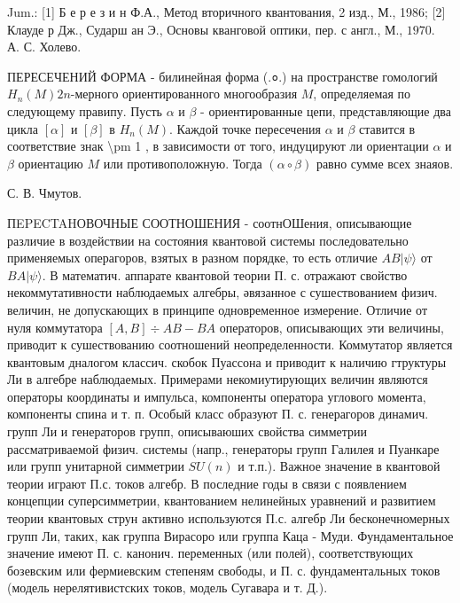 \documentclass[10pt]{article}
\begin{document}
Jum.: [1] Б е р е з и н Ф.А., Метод вторичного квантования, 2 изд., М., 1986; [2] Клауде р Дж., Сударш ан Э., Основы кванговой оптики, пер. с англ., М., $1970 . \quad$ А. С. Холево.



ПЕРЕСЕЧЕНИЙ ФОРМА - билинейная форма (.०.) на пространстве гомологий $H_{n}(M) 2 n$-мерного ориентированного многообразия $M$, определяемая по следующему правипу. Пусть $\alpha$ и $\beta$ - ориентированные цепи, представляющие два цикла $[\alpha]$ и $[\beta]$ в $H_{n}(M)$. Каждой точке пересечения $\alpha$ и $\beta$ ставится в соответствие знак \textbackslash pm 1 , в зависимости от того, индуцируют ли ориентации $\alpha$ и $\beta$ ориентацию $M$ или противоположную. Тогда $(\alpha \circ \beta)$ равно сумме всех знаяов.



С. В. Чмутов.



ПEPECTAHОВОЧНЫЕ СООТНОШЕНИЯ - соотнОШения, описывающие различие в воздействии на состояния квантовой системы последовательно применяемых операгоров, взятых в разном порядке, то есть отличие $A B|\psi\rangle$ от $B A|\psi\rangle$. В математич. аппарате квантовой теории П. с. отражают свойство некоммутативности наблюдаемых алгебры, әвязанное с сушествованием физич. величин, не допускающих в принципе одновременное измерение. Отличие от нуля коммутатора $[A, B] \div A B-B A$ операторов, описывающих эти величины, приводит к сушествованию соотношений неопределенности. Коммутатор является квантовым дналогом классич. скобок Пуассона и приводит к наличию гтруктуры Ли в алгебре наблюдаемых. Примерами некомиутирующих величин являются операторы координаты и импульса, компоненты оператора углового момента, компоненты спина и т. п. Особый класс образуют П. с. генерагоров динамич. групп Ли и генераторов групп, описываюших свойства симметрии рассматриваемой физич. системы (напр., генераторы групп Галилея и Пуанкаре или групп унитарной симметрии $S U(n)$ и т.п.). Важное значение в квантовой теории играют П.с. токов алгебр. В последние годы в связи с появлением концепции суперсимметрии, квантованием нелинейных уравнений и развитием теории квантовых струн активно используются П.с. алгебр Ли бесконечномерных групп Ли, таких, как группа Вирасоро или группа Каца - Муди. Фундаментальное значение имеют П. с. канонич. переменных (или полей), соответствующих бозевским или фермиевским степеням свободы, и П. с. фундаментальных токов (модель нерелятивистских токов, модель Сугавара и т. Д.).
\end{document}
